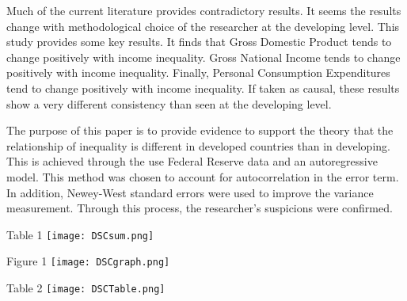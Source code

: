 \documentclass{article}
\begin{document}
\quad Much of the current literature provides contradictory results.  It seems the results change with methodological choice of the researcher at the developing level.  This study provides some key results.  It finds that Gross Domestic Product tends to change positively with income inequality.  Gross National Income tends to change positively with income inequality.  Finally, Personal Consumption Expenditures tend to change positively with income inequality.  If taken as causal, these results show a very different consistency than seen at the developing level. 
\vspace{2mm}

\quad The purpose of this paper is to provide evidence to support the theory that the relationship of inequality is different in developed countries than in developing.  This is achieved through the use Federal Reserve data and an autoregressive model.  This method was chosen to account for autocorrelation in the error term.  In addition, Newey-West standard errors were used to improve the variance measurement. Through this process, the researcher's suspicions were confirmed. 
\quad 

\newpage

Table 1
\vspace{2mm}
\texttt{[image: DSCsum.png]}

\vspace{2mm}
Figure 1
\texttt{[image: DSCgraph.png]}

\vspace{2mm}

\newpage

Table 2
\texttt{[image: DSCTable.png]}
\end{document}

